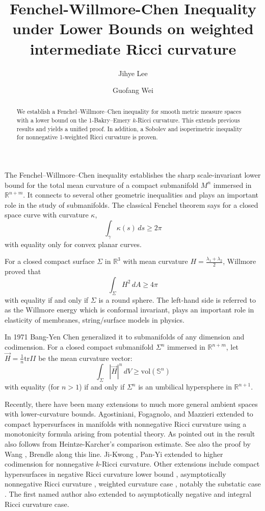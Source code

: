 \documentclass[psamsfonts]{amsart}
\title[]{Fenchel-Willmore-Chen  Inequality under Lower Bounds on weighted intermediate Ricci curvature}
\author[]{Jihye Lee}
\author[]{Guofang Wei}
\theoremstyle{definition}
\theoremstyle{remark}
\newcommand{\vol}{\mbox{vol}}
\numberwithin{equation}{section}
\begin{document}
	
	\begin{abstract}
	 	We establish a Fenchel–Willmore–Chen inequality for smooth metric
measure spaces with a lower bound on the 1-Bakry–Emery $k$-Ricci curvature. This
extends previous results and yields a unified proof. In addition, a Sobolev and isoperimetric inequality for nonnegative 1-weighted Ricci curvature is proven. 
	\end{abstract}
	
	\maketitle


    The Fenchel–Willmore–Chen inequality establishes the sharp scale-invariant lower bound for the total mean curvature of a compact submanifold $M^n$ immersed in $\mathbb R^{n+m}.$  It connects to several other geometric inequalities and plays an important role in the study of submanifolds. The classical Fenchel theorem \cite{Fenchel1929} says for a closed space curve with curvature
$\kappa$, $$\int_{\gamma} \kappa(s) \, ds \geq 2\pi$$
with equality only for convex planar curves. 
 
 For a closed compact surface $\Sigma$ in $\mathbb{R}^3$ with mean curvature $H= \tfrac{\lambda_1 + \lambda_2}{2}$, Willmore \cite{Willmore68} proved that $$\int_{\Sigma} H^2 \, dA \geq 4\pi$$
 with equality if and only if $\Sigma$ is a round sphere. The left-hand side is referred to as the Willmore energy which is conformal invariant, plays an important role in elasticity of membranes, string/surface models in physics. 

In 1971 Bang-Yen Chen \cite{Chen71} generalized it to submanifolds of any dimension and codimension.
For a closed compact  submanifold $\Sigma^n$ immersed in $\mathbb R^{n+m}$, let $\vec{H}= \tfrac 1n \mbox{tr} II$ be the mean curvature vector:
\begin{equation}
    \int_{\Sigma} |\vec{H}|^n \, dV \geq \vol ({\mathbb S}^n)  \label{Chen inequality} 
    \end{equation}
 with equality (for $n>1$) if and only if $\Sigma^n$ is an umbilical hypersphere in $\mathbb R^{n+1}$. 


Recently, there have been many extensions to much more general ambient spaces with lower-curvature bounds. Agostiniani, Fogagnolo, and Mazzieri \cite{AFM2020} extended to compact hypersurfaces in manifolds with nonnegative Ricci curvature using a monotonicity
formula arising from potential theory. As pointed out in \cite{brendle2026} the result also follows from Heintze-Karcher's \cite{Heintze-Karcher} comparison estimate. See also the proof by Wang \cite{XW_willmore}, Brendle \cite[Theorem 6.1]{brendle2026} along this line. Ji-Kwong \cite{JK2025}, Pan-Yi \cite{Pan-Yi2026} extended to higher codimension for nonnegative $k$-Ricci curvature. Other extensions include compact hypersurfaces in negative Ricci curvature lower bound \cite{jin-yin}, asymptotically nonnegative Ricci curvature \cite{rudnik2023}, weighted curvature case \cite{wuwu2024, rudnik2025}, notably the substatic case \cite{borghini2023comparison}. The first named author \cite{lee2025willmore} also extended to  asymptotically negative and integral Ricci curvature case.
\end{document}
